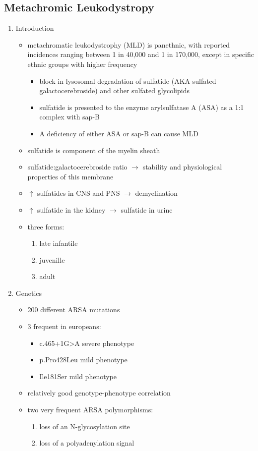 \documentclass{scrartcl}
\begin{document}
\subsection{Metachromic Leukodystropy}
\label{sec:org71c5fd1}
\begin{enumerate}
\item Introduction
\label{sec:orgcdde665}

\begin{itemize}
\item metachromatic leukodystrophy (MLD) is panethnic, with reported
incidences ranging between 1 in 40,000 and 1 in 170,000, except in
specific ethnic groups with higher frequency
\begin{itemize}
\item block in lysosomal degradation of sulfatide (AKA sulfated
galactocerebroside) and other sulfated glycolipids
\item sulfatide is presented to the enzyme arylsulfatase A (ASA) as a
1:1 complex with sap-B
\item A deficiency of either ASA or sap-B can cause MLD
\end{itemize}
\item sulfatide is component of the myelin sheath
\item sulfatide:galactocerebroside ratio \(\to\) stability and physiological properties of this membrane
\item \(\uparrow\) sulfatides in CNS and PNS \(\to\) demyelination
\item \(\uparrow\) sulfatide in the kidney \(\to\) sulfatide in urine

\item three forms:
\begin{enumerate}
\item late infantile
\item juvenille
\item adult
\end{enumerate}
\end{itemize}


\item Genetics
\label{sec:org9641fa9}
\begin{itemize}
\item 200 different ARSA mutations
\item 3 frequent in europeans:
\begin{itemize}
\item c.465+1G>A severe phenotype
\item p.Pro428Leu mild phenotype
\item Ile181Ser mild phenotype
\end{itemize}
\item relatively good genotype-phenotype correlation
\item two very frequent ARSA polymorphisms:
\begin{enumerate}
\item loss of an N-glycosylation site
\item loss of a polyadenylation signal
\end{enumerate}


\end{itemize}
\end{enumerate}
\end{document}
